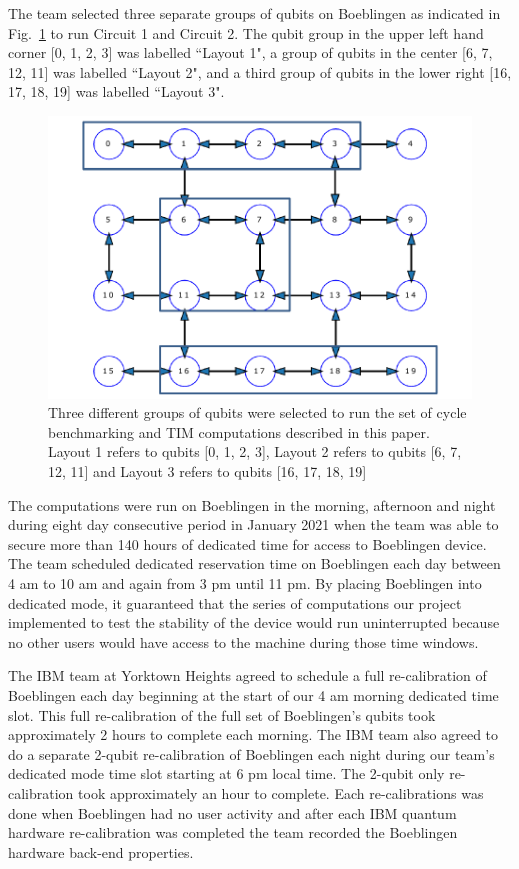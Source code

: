 The team selected three separate groups of qubits on Boeblingen as indicated in Fig.~\ref{fig:Boeblingenlayout} to run Circuit 1 and Circuit 2.  The qubit group in the upper left hand corner [0, 1, 2, 3] was labelled ``Layout 1", a group of qubits in the center [6, 7, 12, 11] was labelled ``Layout 2", and a third group of qubits in the lower right [16, 17, 18, 19] was labelled ``Layout 3".  

\begin{figure}[htpb]
    \centering
    \includegraphics[scale=0.4]{QubitLayoutBoeblingen.pdf}
    \caption{Three different groups of qubits were selected to run the set of cycle benchmarking and TIM computations described in this paper.  Layout 1 refers to qubits [0, 1, 2, 3], Layout 2 refers to qubits [6, 7, 12, 11] and Layout 3 refers to qubits [16, 17, 18, 19] }
    \label{fig:Boeblingenlayout}
\end{figure}


The computations were run on Boeblingen in the morning, afternoon and night during eight day consecutive period in January 2021 when the team was able to secure more than 140 hours of dedicated time for access to Boeblingen device.  The team scheduled dedicated reservation time on Boeblingen each day between 4 am to 10 am and again from 3 pm until 11 pm.  By placing Boeblingen into dedicated mode, it guaranteed that the series of computations our project implemented to test the stability of the device would run uninterrupted because no other users would have access to the machine during those time windows.  

The IBM team at Yorktown Heights agreed to schedule a full re-calibration of Boeblingen each day beginning at the start of our 4 am morning dedicated time slot.  This full re-calibration of the full set of Boeblingen's qubits took approximately 2 hours to complete each morning.  The IBM team also agreed to do a separate 2-qubit re-calibration of Boeblingen each night during our team's dedicated mode time slot starting at 6 pm local time.  The 2-qubit only re-calibration took approximately an hour to complete.  Each re-calibrations was done when Boeblingen had no user activity and after each IBM quantum hardware re-calibration was completed the team recorded the Boeblingen hardware back-end properties.  

